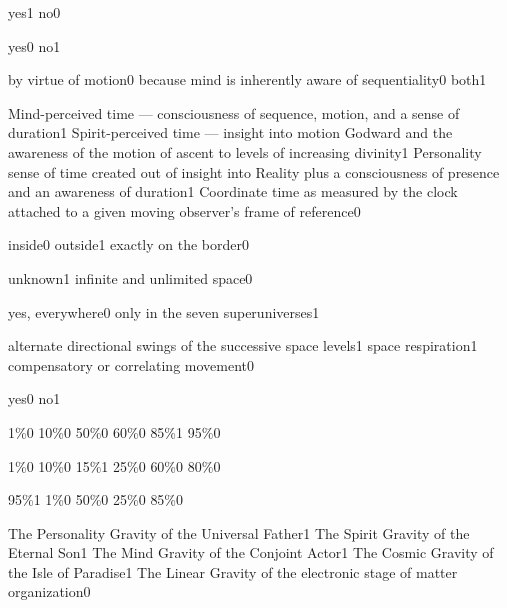 {yes}{1}
{no}{0}
\qstop

{yes}{0}
{no}{1}
\qstop

{by virtue of motion}{0}
{because mind is inherently aware of sequentiality}{0}
{both}{1}
\qstop

{Mind-perceived time --- consciousness of sequence, motion, and a sense of duration}{1}
{Spirit-perceived time --- insight into motion Godward and the awareness of the motion of ascent to levels of increasing divinity}{1}
{Personality sense of time created out of insight into Reality plus a consciousness of presence and an awareness of duration}{1}
{Coordinate time as measured by the clock attached to a given moving observer's frame of reference}{0}
\qstop

{inside}{0}
{outside}{1}
{exactly on the border}{0}
\qstop

{unknown}{1}
{infinite and unlimited space}{0}
\qstop

{yes, everywhere}{0}
{only in the seven superuniverses}{1}
\qstop

{alternate directional swings of the successive space levels}{1}
{space respiration}{1}
{compensatory or correlating movement}{0}
\qstop

{yes}{0}
{no}{1}
\qstop

{1\%}{0}
{10\%}{0}
{50\%}{0}
{60\%}{0}
{85\%}{1}
{95\%}{0}
\qstop

{1\%}{0}
{10\%}{0}
{15\%}{1}
{25\%}{0}
{60\%}{0}
{80\%}{0}
\qstop

{95\%}{1}
{1\%}{0}
{50\%}{0}
{25\%}{0}
{85\%}{0}
\qstop

{The Personality Gravity of the Universal Father}{1}
{The Spirit Gravity of the Eternal Son}{1}
{The Mind Gravity of the Conjoint Actor}{1}
{The Cosmic Gravity of the Isle of Paradise}{1}
{The Linear Gravity of the electronic stage of matter organization}{0}
\qstop

